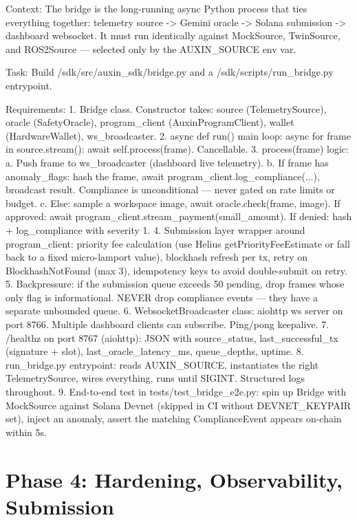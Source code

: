 \documentclass[11pt, a4paper]{article}
\begin{document}
\begin{promptbox}
Context: The bridge is the long-running async Python process that ties everything together: telemetry source -> Gemini oracle -> Solana submission -> dashboard websocket. It must run identically against MockSource, TwinSource, and ROS2Source --- selected only by the AUXIN_SOURCE env var.

Task: Build /sdk/src/auxin_sdk/bridge.py and a /sdk/scripts/run_bridge.py entrypoint.

Requirements:
1. Bridge class. Constructor takes: source (TelemetrySource), oracle (SafetyOracle), program_client (AuxinProgramClient), wallet (HardwareWallet), ws_broadcaster.
2. async def run() main loop: async for frame in source.stream(): await self.process(frame). Cancellable.
3. process(frame) logic:
   a. Push frame to ws_broadcaster (dashboard live telemetry).
   b. If frame has anomaly_flags: hash the frame, await program_client.log_compliance(...), broadcast result. Compliance is unconditional --- never gated on rate limits or budget.
   c. Else: sample a workspace image, await oracle.check(frame, image). If approved: await program_client.stream_payment(small_amount). If denied: hash + log_compliance with severity 1.
4. Submission layer wrapper around program_client: priority fee calculation (use Helius getPriorityFeeEstimate or fall back to a fixed micro-lamport value), blockhash refresh per tx, retry on BlockhashNotFound (max 3), idempotency keys to avoid double-submit on retry.
5. Backpressure: if the submission queue exceeds 50 pending, drop frames whose only flag is informational. NEVER drop compliance events --- they have a separate unbounded queue.
6. WebsocketBroadcaster class: aiohttp ws server on port 8766. Multiple dashboard clients can subscribe. Ping/pong keepalive.
7. /healthz on port 8767 (aiohttp): JSON with source_status, last_successful_tx (signature + slot), last_oracle_latency_ms, queue_depths, uptime.
8. run_bridge.py entrypoint: reads AUXIN_SOURCE, instantiates the right TelemetrySource, wires everything, runs until SIGINT. Structured logs throughout.
9. End-to-end test in tests/test_bridge_e2e.py: spin up Bridge with MockSource against Solana Devnet (skipped in CI without DEVNET_KEYPAIR set), inject an anomaly, assert the matching ComplianceEvent appears on-chain within 5s.
\end{promptbox}

\section{Phase 4: Hardening, Observability, Submission}
\end{document}
